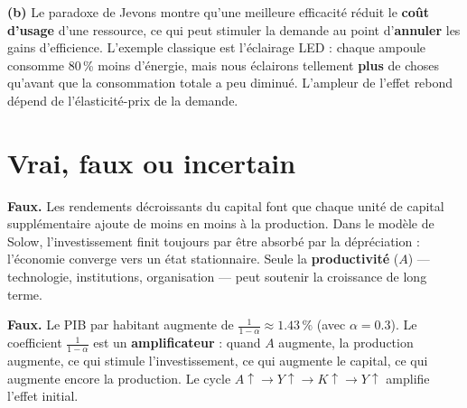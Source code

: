 \begin{reponse}
\textbf{(b)} Le paradoxe de Jevons montre qu'une meilleure efficacité réduit le \textbf{coût d'usage} d'une ressource, ce qui peut stimuler la demande au point d'\textbf{annuler} les gains d'efficience. L'exemple classique est l'éclairage LED : chaque ampoule consomme 80\,\% moins d'énergie, mais nous éclairons tellement \textbf{plus} de choses qu'avant que la consommation totale a peu diminué. L'ampleur de l'effet rebond dépend de l'élasticité-prix de la demande.
\end{reponse}

\section{Vrai, faux ou incertain}

\setcounter{shortcounter}{0}


\begin{reponse}
\textbf{Faux.} Les rendements décroissants du capital font que chaque unité de capital supplémentaire ajoute de moins en moins à la production. Dans le modèle de Solow, l'investissement finit toujours par être absorbé par la dépréciation : l'économie converge vers un état stationnaire. Seule la \textbf{productivité} ($A$) --- technologie, institutions, organisation --- peut soutenir la croissance de long terme.
\end{reponse}


\begin{reponse}
\textbf{Faux.} Le PIB par habitant augmente de $\frac{1}{1-\alpha} \approx 1.43\,\%$ (avec $\alpha = 0.3$). Le coefficient $\frac{1}{1-\alpha}$ est un \textbf{amplificateur} : quand $A$ augmente, la production augmente, ce qui stimule l'investissement, ce qui augmente le capital, ce qui augmente encore la production. Le cycle $A\uparrow \to Y\uparrow \to K\uparrow \to Y\uparrow$ amplifie l'effet initial.
\end{reponse}


